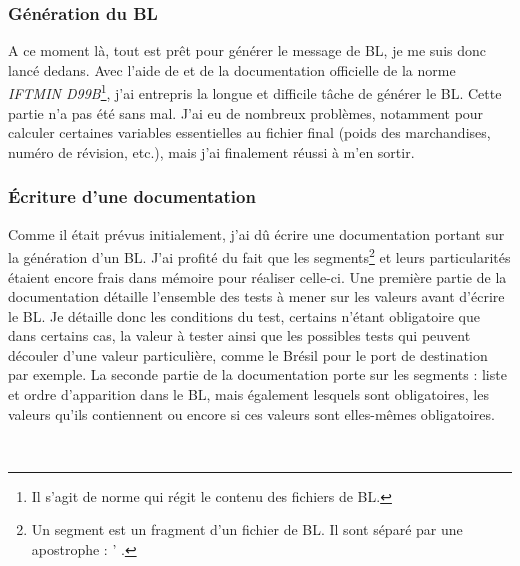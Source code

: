 \subsubsection{Génération du BL}
A ce moment là, tout est prêt pour générer le message de BL, je me suis donc lancé dedans. Avec l'aide de \pireus{} et de la documentation officielle de la norme \emph{IFTMIN D99B}\footnote{Il s'agit de norme qui régit le contenu des fichiers de BL.}, j'ai entrepris la longue et difficile tâche de générer le BL. Cette partie n'a pas été sans mal. J'ai eu de nombreux problèmes, notamment pour calculer certaines variables essentielles au fichier final (poids des marchandises, numéro de révision, etc.), mais j'ai finalement réussi à m'en sortir.

\subsubsection{Écriture d'une documentation}
Comme il était prévus initialement, j'ai dû écrire une documentation portant sur la génération d'un BL. J'ai profité du fait que les segments\footnote{Un segment est un fragment d'un fichier de BL. Il sont séparé par une apostrophe : \og ' \fg.} et leurs particularités étaient encore frais dans mémoire pour réaliser celle-ci. Une première partie de la documentation détaille l'ensemble des tests à mener sur les valeurs avant d'écrire le BL. Je détaille donc les conditions du test, certains n'étant obligatoire que dans certains cas, la valeur à tester ainsi que les possibles tests qui peuvent découler d'une valeur particulière, comme le Brésil pour le port de destination par exemple. La seconde partie de la documentation porte sur les segments : liste et ordre d'apparition dans le BL, mais également lesquels sont obligatoires, les valeurs qu'ils contiennent ou encore si ces valeurs sont elles-mêmes obligatoires.

~

